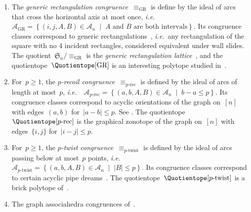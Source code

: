 \documentclass{amsart}
\theoremstyle{definition}
\newcommand{\f}[1]{{\mathfrak{#1}}} %
\newcommand{\set}[2]{\left\{ #1 \;\middle|\; #2 \right\}} %
\newcommand{\ie}{\textit{i.e.}~} %
\newcommand{\darkblue}{\color{darkblue}} %
\newcommand{\defn}[1]{\textsl{\darkblue #1}} %
\newcommand{\vincent}[1]{\todo[color=blue!30]{#1 \\ \hfill --- V.}}
\newcommand{\arcs}{{\mathcal{A}}} %
\begin{document}
\begin{enumerate}
\item \label{item:GenericRectangulationCongruence}
The \defn{generic rectangulation congruence}~$\equiv_\textrm{GR}$ is define by the ideal of arcs that cross the horizontal axis at most once, \ie~$\arcs_\textrm{GR} = \set{(i, j, A, B) \in \arcs_n}{A \text{ and } B \text{ are both intervals}}$.
Its congruence classes correspond to generic rectangulations~\cite{Reading-rectangulations}, \ie any rectangulation of the square with no $4$ incident rectangles, considered equivalent under wall slides.
The quotient~$\f{S}_n / {\equiv_\textrm{GR}}$ is the \defn{generic rectangulation lattice}~\cite{Reading-rectangulations}, and the quotientope~$\Quotientope[\textrm{GR}]$  is an interesting polytope studied in~\cite{CardinalPilaud}.

\item 
For~$p \ge 1$, the \defn{$p$-recoil congruence}~$\equiv_{p\textrm{-rec}}$ is defined by the ideal of arcs of length at most~$p$, \ie~$\arcs_{p\textrm{-rec}} = \set{(a, b, A, B) \in \arcs_n}{b-a \le p}$.
Its congruence classes correspond to acyclic orientations of the graph on~$[n]$ with edges~$(a,b)$ for~$|a-b| \le p$.
See \cite{NovelliReutenauerThibon, Reading-HopfAlgebras, Pilaud-brickAlgebra}.
The quotientope~$\Quotientope[p\textrm{-rec}]$ is the graphical zonotope of the graph on~$[n]$ with edges~$\{i,j\}$ for~$|i-j| \le p$.

\item
For~$p \ge 1$, the \defn{$p$-twist congruence}~$\equiv_{p\textrm{-twist}}$ is defined by the ideal of arcs passing below at most~$p$ points, \ie~$\arcs_{p\textrm{-twist}} = \set{(a, b, A, B) \in \arcs_n}{|B| \le p}$.
Its congruence classes correspond to certain acyclic pipe dreams~\cite{Pilaud-brickAlgebra}.
The quotientope~$\Quotientope[p\textrm{-twist}]$ is a brick polytope of~\cite{PilaudSantos-brickPolytope,PilaudStump-brickPolytope}.

\item
The graph associahedra congruences of~\cite{BarnardMcConville}.
\vincent{todo}
\end{enumerate}
\end{document}
